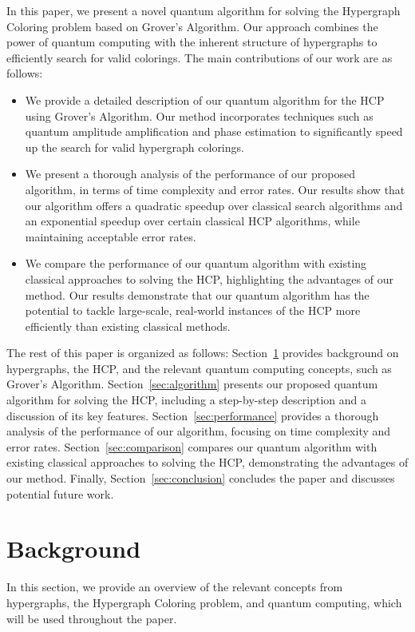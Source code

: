 In this paper, we present a novel quantum algorithm for solving the Hypergraph Coloring problem based on Grover's Algorithm. Our approach combines the power of quantum computing with the inherent structure of hypergraphs to efficiently search for valid colorings. The main contributions of our work are as follows:

\begin{itemize}
    \item We provide a detailed description of our quantum algorithm for the HCP using Grover's Algorithm. Our method incorporates techniques such as quantum amplitude amplification and phase estimation to significantly speed up the search for valid hypergraph colorings.
    
    \item We present a thorough analysis of the performance of our proposed algorithm, in terms of time complexity and error rates. Our results show that our algorithm offers a quadratic speedup over classical search algorithms and an exponential speedup over certain classical HCP algorithms, while maintaining acceptable error rates.
    
    \item We compare the performance of our quantum algorithm with existing classical approaches to solving the HCP, highlighting the advantages of our method. Our results demonstrate that our quantum algorithm has the potential to tackle large-scale, real-world instances of the HCP more efficiently than existing classical methods.
\end{itemize}

The rest of this paper is organized as follows: Section~\ref{sec:background} provides background on hypergraphs, the HCP, and the relevant quantum computing concepts, such as Grover's Algorithm. Section~\ref{sec:algorithm} presents our proposed quantum algorithm for solving the HCP, including a step-by-step description and a discussion of its key features. Section~\ref{sec:performance} provides a thorough analysis of the performance of our algorithm, focusing on time complexity and error rates. Section~\ref{sec:comparison} compares our quantum algorithm with existing classical approaches to solving the HCP, demonstrating the advantages of our method. Finally, Section~\ref{sec:conclusion} concludes the paper and discusses potential future work.

\section{Background}\label{sec:background}
In this section, we provide an overview of the relevant concepts from hypergraphs, the Hypergraph Coloring problem, and quantum computing, which will be used throughout the paper.

